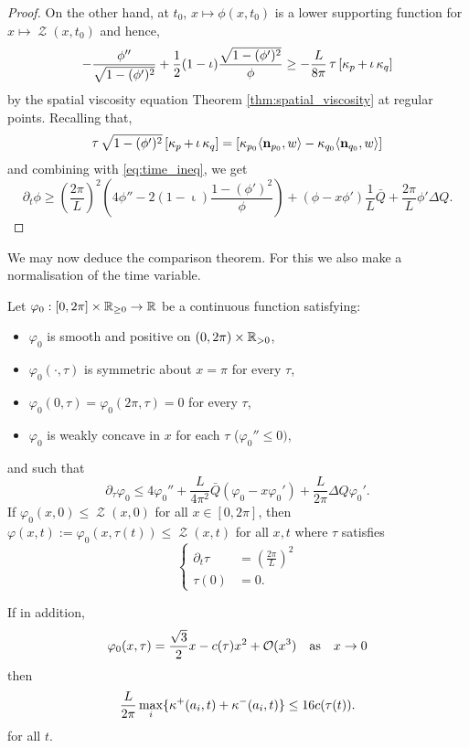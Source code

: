 \documentclass[11pt]{amsart}
\DeclareMathOperator{\chordarcprofile}{\mathcal{Z}}
\DeclareMathOperator{\tangindicator}{\iota}
\DeclareMathOperator{\norindicator}{\tau}
\begin{document}
\begin{proof}
On the other hand, at $t_0$, $x \mapsto \phi(x, t_0)$ is a lower supporting function for $x \mapsto \chordarcprofile(x, t_0)$ and hence,
\begin{equation}
\label{eq:spatial_inequality}
-\frac{\phi''}{\sqrt{1-(\phi')^2}} + \frac{1}{2} (1-\tangindicator) \frac{\sqrt{1 - (\phi')^2}}{\phi} \geq -\frac{L}{8\pi} \norindicator \left[\curvecurv_p + \tangindicator \curvecurv_q\right]
\end{equation}
by the spatial viscosity equation Theorem \ref{thm:spatial_viscosity} at regular points. Recalling that,
\[
\norindicator \sqrt{1 - (\phi')^2} \left[\curvecurv_p + \tangindicator \curvecurv_q\right] = \left[\curvecurv_{p_0} \ip{\nor_{p_0}}{w} - \curvecurv_{q_0} \ip{\nor_{q_0}}{w}\right]
\]
and combining with \eqref{eq:time_ineq}, we get
\[
\partial_t \phi \geq \left(\frac{2\pi}{L}\right)^2 \left(4 \phi'' - 2 (1-\tangindicator) \frac{1 - (\phi')^2}{\phi}\right) + \left(\phi - x \phi'\right) \frac{1}{L} \bar{Q} + \frac{2\pi}{L} \phi' \Delta Q.
\]
\end{proof}

We may now deduce the comparison theorem. For this we also make a normalisation of the time variable.

\begin{theorem}
\label{thm:comparison}

Let $\varphi_0 : [0, 2\pi] \times \mathbb{R}_{\geq 0} \to \mathbb{R}$ be a continuous function satisfying:
\begin{itemize}
\item $\varphi_0$ is smooth and positive on $(0, 2\pi) \times \mathbb{R}_{>0}$,
\item $\varphi_0(\cdot, \tau)$ is symmetric about $x = \pi$ for every $\tau$,
\item $\varphi_0(0, \tau) = \varphi_0(2\pi, \tau) = 0$ for every $\tau$,
\item $\varphi_0$ is weakly concave in $x$ for each $\tau$ ($\varphi_0'' \leq 0)$,
\end{itemize}
and such that
\begin{equation}
\label{eq:comparison_ineq}
\partial_{\tau} \varphi_0 \leq 4 \varphi_0'' + \frac{L}{4\pi^2} \bar{Q} (\varphi_0 - x \varphi_0') + \frac{L}{2\pi} \Delta Q \varphi_0'.
\end{equation}
If $\varphi_0(x, 0) \leq \chordarcprofile(x, 0)$ for all $x \in [0, 2\pi]$, then $\varphi(x, t) := \varphi_0(x, \tau(t)) \leq \chordarcprofile(x, t)$ for all $x, t$ where $\tau$ satisfies
\[
\begin{cases}
\partial_t \tau &= \left(\frac{2\pi}{L}\right)^2 \\
\tau(0) &= 0.
\end{cases}
\]

If in addition,
\[
\varphi_0(x, \tau) = \frac{\sqrt{3}}{2} x - c(\tau) x^2 + \operatorname{\mathcal{O}}(x^3) \quad \text{as} \quad x \to 0
\]
then
\[
\frac{L}{2\pi} \max_i \{\operatorname{\kappa}^+(a_i, t) + \operatorname{\kappa}^-(a_i, t)\} \leq 16 c(\tau(t)).
\]
for all $t$.
\end{theorem}
\end{document}
